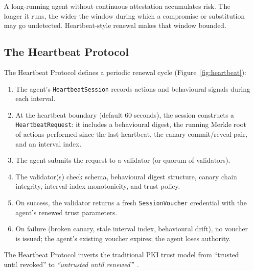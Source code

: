 \documentclass[11pt,a4paper]{article}
\begin{document}
A long-running agent without continuous attestation accumulates risk. The longer it runs, the wider the window during which a compromise or substitution may go undetected. Heartbeat-style renewal makes that window bounded.

\subsection{The Heartbeat Protocol}

The Heartbeat Protocol defines a periodic renewal cycle (Figure~\ref{fig:heartbeat}):

\begin{enumerate}[label=\arabic*.,leftmargin=*]
\item The agent's \verb|HeartbeatSession| records actions and behavioural signals during each interval.
\item At the heartbeat boundary (default 60 seconds), the session constructs a \verb|HeartbeatRequest|: it includes a behavioural digest, the running Merkle root of actions performed since the last heartbeat, the canary commit/reveal pair, and an interval index.
\item The agent submits the request to a validator (or quorum of validators).
\item The validator(s) check schema, behavioural digest structure, canary chain integrity, interval-index monotonicity, and trust policy.
\item On success, the validator returns a fresh \verb|SessionVoucher| credential with the agent's renewed trust parameters.
\item On failure (broken canary, stale interval index, behavioural drift), no voucher is issued; the agent's existing voucher expires; the agent loses authority.
\end{enumerate}

The Heartbeat Protocol inverts the traditional PKI trust model from ``trusted until revoked'' to \emph{``untrusted until renewed''}~\cite{pad016}.
\end{document}
